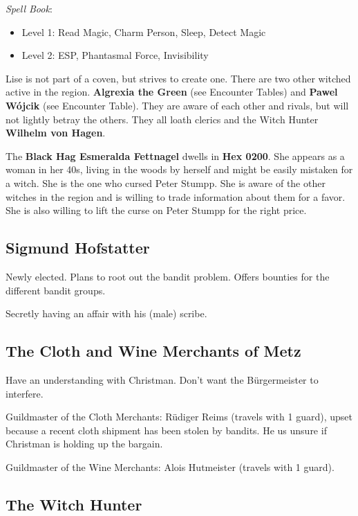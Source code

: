 \documentclass[
]{book}
\begin{document}
\emph{Spell Book}:

\begin{itemize}
\item
  Level 1: Read Magic, Charm Person, Sleep, Detect Magic
\item
  Level 2: ESP, Phantasmal Force, Invisibility
\end{itemize}

Lise is not part of a coven, but strives to create one. There are two other witched active in the region. \textbf{Algrexia the Green} (see Encounter Tables) and \textbf{Pawel Wójcik} (see Encounter Table). They are aware of each other and rivals, but will not lightly betray the others. They all loath clerics and the Witch Hunter \textbf{Wilhelm von Hagen}.

The \textbf{Black Hag Esmeralda Fettnagel} dwells in \textbf{Hex 0200}. She appears as a woman in her 40s, living in the woods by herself and might be easily mistaken for a witch. She is the one who cursed Peter Stumpp. She is aware of the other witches in the region and is willing to trade information about them for a favor. She is also willing to lift the curse on Peter Stumpp for the right price.

\subsection{Sigmund Hofstatter}\label{sigmund-hofstatter}

Newly elected. Plans to root out the bandit problem. Offers bounties for the different bandit groups.

Secretly having an affair with his (male) scribe.

\subsection{The Cloth and Wine Merchants of Metz}\label{the-cloth-and-wine-merchants-of-metz}

Have an understanding with Christman. Don't want the Bürgermeister to interfere.

Guildmaster of the Cloth Merchants: Rüdiger Reims (travels with 1 guard), upset because a recent cloth shipment has been stolen by bandits. He us unsure if Christman is holding up the bargain.

Guildmaster of the Wine Merchants: Alois Hutmeister (travels with 1 guard).

\subsection{The Witch Hunter}\label{the-witch-hunter}
\end{document}
